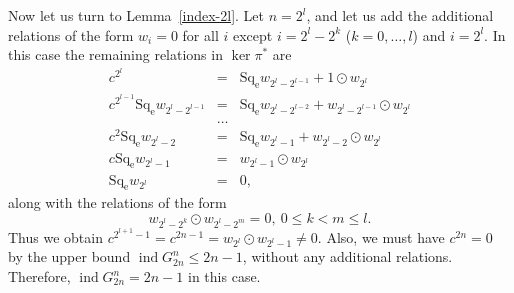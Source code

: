 \documentclass[12pt,a4paper]{amsart}
\theoremstyle{definition}
\theoremstyle{remark}
\begin{document}
Now let us turn to Lemma~\ref{index-2l}. Let $n=2^l$, and let us add the additional relations of the form $w_i = 0$ for all $i$ except $i= 2^l-2^k$ ($k=0,\ldots, l$) and $i=2^l$. In this case the remaining relations in $\ker\pi^*$ are 
\begin{eqnarray*}
c^{2^l} &=& \operatorname{Sq_e} w_{2^l-2^{l-1}} + 1\odot w_{2^l}\\
c^{2^{l-1}} \operatorname{Sq_e} w_{2^l-2^{l-1}} &=& \operatorname{Sq_e} w_{2^l-2^{l-2}} + w_{2^l-2^{l-1}}\odot w_{2^l}\\
&\dots&\\
c^2 \operatorname{Sq_e} w_{2^l-2} &=& \operatorname{Sq_e} w_{2^l-1} + w_{2^l-2}\odot w_{2^l}\\
c \operatorname{Sq_e} w_{2^l-1} &=& w_{2^l-1}\odot w_{2^l}\\
\operatorname{Sq_e} w_{2^l} &=& 0,
\end{eqnarray*}
along with the relations of the form
$$
w_{2^l-2^k}\odot w_{2^l-2^m} = 0,\ 0\le k<m\le l.
$$
Thus we obtain $c^{2^{l+1}-1} = c^{2n-1} = w_{2^l}\odot w_{2^l-1}\not=0$. Also, we must have $c^{2n}=0$ by the upper bound $\operatorname{ind} G_{2n}^n\le 2n-1$, without any additional relations. Therefore, $\operatorname{ind} G_{2n}^n=2n-1$ in this case.
\end{document}
